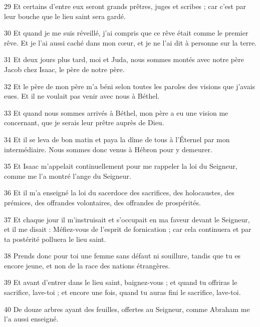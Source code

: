 \par 29 Et certains d'entre eux seront grands prêtres, juges et scribes ; car c'est par leur bouche que le lieu saint sera gardé.

\par 30 Et quand je me suis réveillé, j'ai compris que ce rêve était comme le premier rêve. Et je l'ai aussi caché dans mon cœur, et je ne l'ai dit à personne sur la terre.

\par 31 Et deux jours plus tard, moi et Juda, nous sommes montés avec notre père Jacob chez Isaac, le père de notre père.

\par 32 Et le père de mon père m'a béni selon toutes les paroles des visions que j'avais eues. Et il ne voulait pas venir avec nous à Béthel.

\par 33 Et quand nous sommes arrivés à Béthel, mon père a eu une vision me concernant, que je serais leur prêtre auprès de Dieu.

\par 34 Et il se leva de bon matin et paya la dîme de tous à l'Éternel par mon intermédiaire. Nous sommes donc venus à Hébron pour y demeurer.

\par 35 Et Isaac m'appelait continuellement pour me rappeler la loi du Seigneur, comme me l'a montré l'ange du Seigneur.

\par 36 Et il m'a enseigné la loi du sacerdoce des sacrifices, des holocaustes, des prémices, des offrandes volontaires, des offrandes de prospérités.

\par 37 Et chaque jour il m'instruisait et s'occupait en ma faveur devant le Seigneur, et il me disait : Méfiez-vous de l'esprit de fornication ; car cela continuera et par ta postérité polluera le lieu saint.

\par 38 Prends donc pour toi une femme sans défaut ni souillure, tandis que tu es encore jeune, et non de la race des nations étrangères.

\par 39 Et avant d'entrer dans le lieu saint, baignez-vous ; et quand tu offriras le sacrifice, lave-toi ; et encore une fois, quand tu auras fini le sacrifice, lave-toi.

\par 40 De douze arbres ayant des feuilles, offertes au Seigneur, comme Abraham me l'a aussi enseigné.

